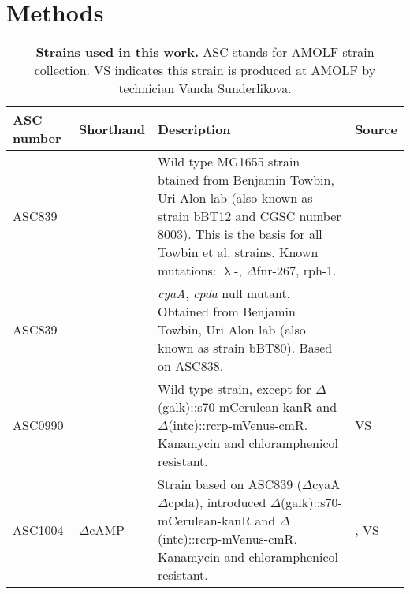 \section*{Methods}



\begin{table}[h]
	\begin{tabularx}{\textwidth}{llXl}

	\textbf{ASC number}	& \textbf{Shorthand} & \textbf{Description} & \textbf{Source}		\\
	\hline

	ASC839	& 				& Wild type MG1655 strain btained from Benjamin Towbin, Uri Alon lab (also known as strain bBT12 and CGSC number 8003). This is the basis for all Towbin et al. strains. Known mutations: $\uplambda$-, 	$\Delta$fnr-267, rph-1. & \cite{Towbin2017} \\
	ASC839	& 				& \textit{cyaA}, \textit{cpda} null mutant. Obtained from Benjamin Towbin, Uri Alon lab (also known as strain bBT80). Based on ASC838. & \cite{Towbin2017} \\
	
	
	ASC0990  &  			& Wild type strain, except for $\Delta$(galk)::s70-mCerulean-kanR and $\Delta$(intc)::rcrp-mVenus-cmR. Kanamycin and chloramphenicol resistant. & VS \\
	ASC1004  & $\Delta$cAMP & Strain based on ASC839 ($\Delta$cyaA $\Delta$cpda), introduced $\Delta$(galk)::s70-mCerulean-kanR and $\Delta$(intc)::rcrp-mVenus-cmR. Kanamycin and chloramphenicol resistant. & \cite{Towbin2017}, VS \\
	
	\hline
	\end{tabularx}
	\caption{\textbf{Strains used in this work.} ASC stands for AMOLF strain collection. VS indicates this strain is produced at AMOLF by technician Vanda Sunderlikova.}
\end{table}

